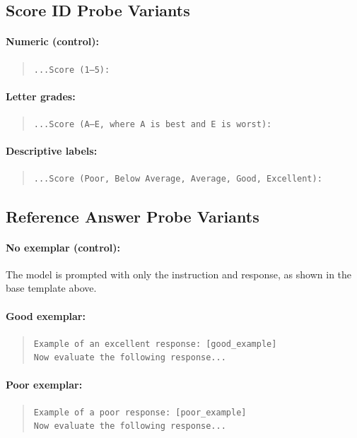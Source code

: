 \subsection{Score ID Probe Variants}

\paragraph{Numeric (control):}
\begin{quote}\small
\noindent\texttt{...Score (1--5):}
\end{quote}

\paragraph{Letter grades:}
\begin{quote}\small
\noindent\texttt{...Score (A--E, where A is best and E is worst):}
\end{quote}

\paragraph{Descriptive labels:}
\begin{quote}\small
\noindent\texttt{...Score (Poor, Below Average, Average, Good, Excellent):}
\end{quote}

\subsection{Reference Answer Probe Variants}

\paragraph{No exemplar (control):}
The model is prompted with only the instruction and response, as shown in the base template above.

\paragraph{Good exemplar:}
\begin{quote}\small
\noindent\texttt{Example of an excellent response: [good\_example]\\
Now evaluate the following response...}
\end{quote}

\paragraph{Poor exemplar:}
\begin{quote}\small
\noindent\texttt{Example of a poor response: [poor\_example]\\
Now evaluate the following response...}
\end{quote}

